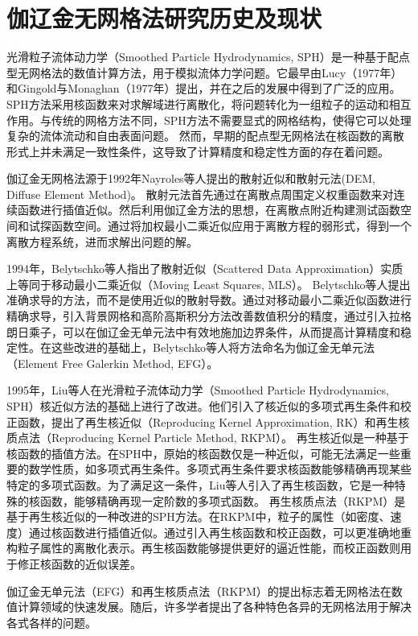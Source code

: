 \section{伽辽金无网格法研究历史及现状}
光滑粒子流体动力学（Smoothed Particle Hydrodynamics, SPH）是一种基于配点型无网格法的数值计算方法，用于模拟流体力学问题。它最早由Lucy（1977年）和Gingold与Monaghan（1977年）提出，并在之后的发展中得到了广泛的应用。
SPH方法采用核函数来对求解域进行离散化，将问题转化为一组粒子的运动和相互作用。与传统的网格方法不同，SPH方法不需要显式的网格结构，使得它可以处理复杂的流体流动和自由表面问题。
然而，早期的配点型无网格法在核函数的离散形式上并未满足一致性条件，这导致了计算精度和稳定性方面的存在着问题。\par
伽辽金无网格法源于1992年Nayroles等人提出的散射近似和散射元法(DEM, Diffuse Element Method)。
散射元法首先通过在离散点周围定义权重函数来对连续函数进行插值近似。然后利用伽辽金方法的思想，在离散点附近构建测试函数空间和试探函数空间。通过将加权最小二乘近似应用于离散方程的弱形式，得到一个离散方程系统，进而求解出问题的解。\par
1994年，Belytschko等人指出了散射近似（Scattered Data Approximation）实质上等同于移动最小二乘近似（Moving Least Squares, MLS）。
Belytschko等人提出准确求导的方法，而不是使用近似的散射导数。通过对移动最小二乘近似函数进行精确求导，引入背景网格和高阶高斯积分方法改善数值积分的精度，通过引入拉格朗日乘子，可以在伽辽金无单元法中有效地施加边界条件，从而提高计算精度和稳定性。在这些改进的基础上，Belytschko等人将方法命名为伽辽金无单元法（Element Free Galerkin Method, EFG）。\par
1995年，Liu等人在光滑粒子流体动力学（Smoothed Particle Hydrodynamics, SPH）核近似方法的基础上进行了改进。他们引入了核近似的多项式再生条件和校正函数，提出了再生核近似（Reproducing Kernel Approximation, RK）和再生核质点法（Reproducing Kernel Particle Method, RKPM）。
再生核近似是一种基于核函数的插值方法。在SPH中，原始的核函数仅是一种近似，可能无法满足一些重要的数学性质，如多项式再生条件。多项式再生条件要求核函数能够精确再现某些特定的多项式函数。为了满足这一条件，Liu等人引入了再生核函数，它是一种特殊的核函数，能够精确再现一定阶数的多项式函数。
再生核质点法（RKPM）是基于再生核近似的一种改进的SPH方法。在RKPM中，粒子的属性（如密度、速度）通过核函数进行插值近似。通过引入再生核函数和校正函数，可以更准确地重构粒子属性的离散化表示。再生核函数能够提供更好的逼近性能，而校正函数则用于修正核函数的近似误差。\par
伽辽金无单元法（EFG）和再生核质点法（RKPM）的提出标志着无网格法在数值计算领域的快速发展。随后，许多学者提出了各种特色各异的无网格法用于解决各式各样的问题。
